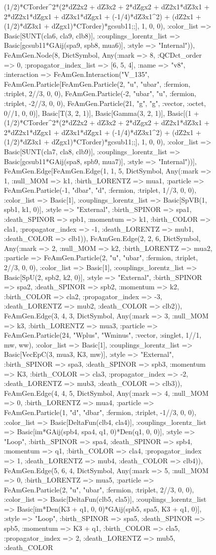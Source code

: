 \documentclass{revtex4}
\begin{document}
\begin{figure}[!htb]
\begin{center}
{(1/2)*CTorder^2*(2*dZ2x2 + dZ3x2 + 2*dZgx2 + dZ2x1*dZ3x1 + 2*dZ2x1*dZgx1 + dZ3x1*dZgx1 + (-1/4)*dZ3x1^2) + (dZ2x1 + (1/2)*dZ3x1 + dZgx1)*CTorder)*gcsub11;;], 1, 0, 0), :color_list => Basic[SUNT(cla6, cla9, clb8)], :couplings_lorentz_list => Basic[gcsub11*GAij(spa9, spb8, mua6)], :style => "Internal")), FeAmGen.Node(8, Dict{Symbol, Any}(:mark => 8, :QCDct_order => 0, :propagator_index_list => [6, 5, 4], :name => "v8", :interaction => FeAmGen.Interaction("V_135", FeAmGen.Particle[FeAmGen.Particle(2, "u", "ubar", :fermion, :triplet, 2//3, 0, 0), FeAmGen.Particle(-2, "ubar", "u", :fermion, :triplet, -2//3, 0, 0), FeAmGen.Particle(21, "g", "g", :vector, :octet, 0//1, 0, 0)], Basic[T(3, 2, 1)], Basic[Gamma(3, 2, 1)], Basic[(1 + (1/2)*CTorder^2*(2*dZ2x2 + dZ3x2 + 2*dZgx2 + dZ2x1*dZ3x1 + 2*dZ2x1*dZgx1 + dZ3x1*dZgx1 + (-1/4)*dZ3x1^2) + (dZ2x1 + (1/2)*dZ3x1 + dZgx1)*CTorder)*gcsub11;;], 1, 0, 0), :color_list => Basic[SUNT(cla7, cla8, clb9)], :couplings_lorentz_list => Basic[gcsub11*GAij(spa8, spb9, mua7)], :style => "Internal"))], FeAmGen.Edge[FeAmGen.Edge(1, 1, 5, Dict{Symbol, Any}(:mark => 1, :null_MOM => k1, :birth_LORENTZ => mua1, :particle => FeAmGen.Particle(-1, "dbar", "d", :fermion, :triplet, 1//3, 0, 0), :color_list => Basic[1], :couplings_lorentz_list => Basic[SpVB(1, spb1, k1, 0)], :style => "External", :birth_SPINOR => spa1, :death_SPINOR => spb1, :momentum => k1, :birth_COLOR => cla1, :propagator_index => -1, :death_LORENTZ => mub1, :death_COLOR => clb1)), FeAmGen.Edge(2, 2, 6, Dict{Symbol, Any}(:mark => 2, :null_MOM => k2, :birth_LORENTZ => mua2, :particle => FeAmGen.Particle(2, "u", "ubar", :fermion, :triplet, 2//3, 0, 0), :color_list => Basic[1], :couplings_lorentz_list => Basic[SpU(2, spb2, k2, 0)], :style => "External", :birth_SPINOR => spa2, :death_SPINOR => spb2, :momentum => k2, :birth_COLOR => cla2, :propagator_index => -3, :death_LORENTZ => mub2, :death_COLOR => clb2)), FeAmGen.Edge(3, 4, 3, Dict{Symbol, Any}(:mark => 3, :null_MOM => k3, :birth_LORENTZ => mua3, :particle => FeAmGen.Particle(24, "Wplus", "Wminus", :vector, :singlet, 1//1, mw, ww), :color_list => Basic[1], :couplings_lorentz_list => Basic[VecEpC(3, mua3, K3, mw)], :style => "External", :birth_SPINOR => spa3, :death_SPINOR => spb3, :momentum => K3, :birth_COLOR => cla3, :propagator_index => -2, :death_LORENTZ => mub3, :death_COLOR => clb3)), FeAmGen.Edge(4, 4, 5, Dict{Symbol, Any}(:mark => 4, :null_MOM => 0, :birth_LORENTZ => mua4, :particle => FeAmGen.Particle(1, "d", "dbar", :fermion, :triplet, -1//3, 0, 0), :color_list => Basic[DeltaFun(clb4, cla4)], :couplings_lorentz_list => Basic[im*GAij(spb4, spa4, q1, 0)*Den(q1, 0, 0)], :style => "Loop", :birth_SPINOR => spa4, :death_SPINOR => spb4, :momentum => q1, :birth_COLOR => cla4, :propagator_index => 1, :death_LORENTZ => mub4, :death_COLOR => clb4)), FeAmGen.Edge(5, 6, 4, Dict{Symbol, Any}(:mark => 5, :null_MOM => 0, :birth_LORENTZ => mua5, :particle => FeAmGen.Particle(2, "u", "ubar", :fermion, :triplet, 2//3, 0, 0), :color_list => Basic[DeltaFun(clb5, cla5)], :couplings_lorentz_list => Basic[im*Den(K3 + q1, 0, 0)*GAij(spb5, spa5, K3 + q1, 0)], :style => "Loop", :birth_SPINOR => spa5, :death_SPINOR => spb5, :momentum => K3 + q1, :birth_COLOR => cla5, :propagator_index => 2, :death_LORENTZ => mub5, :death_COLOR }
\end{center}
\end{figure}
\end{document}
